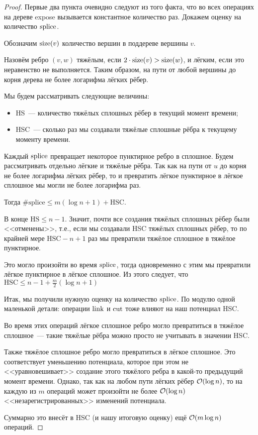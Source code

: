 \begin{proof}

Первые два пункта очевидно следуют из того факта, что во всех операциях на дереве expose вызывается константное количество раз. Докажем оценку на количество $\operatorname{splice}$.

Обозначим $\operatorname{size}(v)$ количество вершин в поддереве вершины $v$.

Назовём ребро $(v, w)$ тяжёлым, если $2 \cdot \operatorname{size}(v) > \operatorname{size}(w)$, и лёгким, если это неравенство не выполняется. Таким образом, на пути от любой вершины до корня дерева не более логарифма лёгких рёбер.

Мы будем рассматривать следующие величины:

\begin{itemize}
	\item HS~--- количество тяжёлых сплошных рёбер в текущий момент времени;
	\item HSC~--- сколько раз мы создавали тяжёлые сплошные рёбра к текущему моменту времени.
\end{itemize}

Каждый $\operatorname{splice}$ превращает некоторое пунктирное ребро в сплошное. Будем рассматривать отдельно лёгкие и тяжёлые рёбра. Так как на пути от $u$ до корня не более логарифма лёгких рёбер, то и превратить лёгкое пунктирное в лёгкое сплошное мы могли не более логарифма раз.

Тогда $\# \text{splice} \leq m (\log{n} + 1) + \text{HSC}$.

В конце $\text{HS} \leq n - 1$. Значит, почти все создания тяжёлых сплошных рёбер были <<отменены>>, т.е., если мы создавали HSC тяжёлых сплошных рёбер, то по крайней мере $\text{HSC} - n + 1$ раз мы превратили тяжёлое сплошное в тяжёлое пунктирное.

Это могло произойти во время $\operatorname{splice}$, тогда одновременно с этим мы превратили лёгкое пунктирное в лёгкое сплошное. Из этого следует, что $\text{HSC} \leq n - 1 + \frac{m}{2}(\log{n} + 1)$

Итак, мы получили нужную оценку на количество $\operatorname{splice}$. По модулю одной маленькой детали: операции $\operatorname{link}$ и $\operatorname{cut}$ тоже влияют на наш потенциал HSC.

Во время этих операций лёгкое сплошное ребро могло превратиться в тяжёлое сплошное~--- такие тяжёлые рёбра можно просто не учитывать в значении HSC.

Также тяжёлое сплошное ребро могло превратиться в лёгкое сплошное. Это соответствует уменьшению потенциала, которое при этом не <<уравновешивает>> создание этого тяжёлого ребра в какой-то предыдущий момент времени. Однако, так как на любом пути лёгких рёбер $\mathcal{O}(\log{n})$, то на каждую из $m$ операций может произойти не более $\mathcal{O}(\log{n})$ <<незарегистрированных>> изменений потенциала.

Суммарно это внесёт в HSC (и нашу итоговую оценку) ещё $\mathcal{O}(m \log{n})$ операций.

\end{proof}

